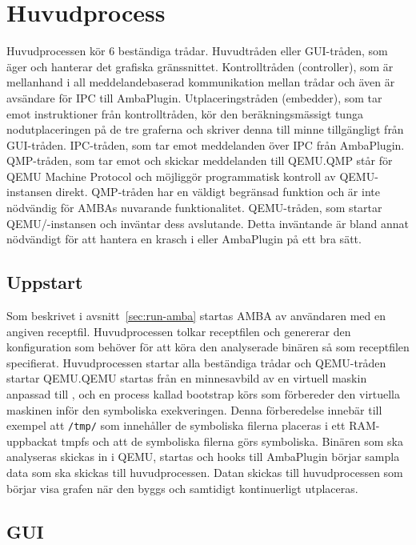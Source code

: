 \section{Huvudprocess}

Huvudprocessen kör 6 beständiga trådar.
Huvudtråden eller GUI-tråden, som äger och hanterar det grafiska gränssnittet.
Kontrolltråden (controller), som är mellanhand i all meddelandebaserad
kommunikation mellan trådar och även är avsändare för IPC till AmbaPlugin.
Utplaceringstråden (embedder), som tar emot instruktioner från kontrolltråden,
kör den beräkningsmässigt tunga nodutplaceringen på de tre graferna och skriver
denna till minne tillgängligt från GUI-tråden.
IPC-tråden, som tar emot meddelanden över IPC från AmbaPlugin.
QMP-tråden, som tar emot och skickar meddelanden till QEMU.\@ QMP står för QEMU
Machine Protocol och möjliggör programmatisk kontroll av QEMU-instansen direkt.
QMP-tråden har en väldigt begränsad funktion och är inte nödvändig för AMBAs
nuvarande funktionalitet.
QEMU-tråden, som startar QEMU/\stoe{}-instansen och inväntar dess avslutande.
Detta inväntande är bland annat nödvändigt för att hantera en krasch i \stoe{}
eller AmbaPlugin på ett bra sätt.

\subsection{Uppstart}

Som beskrivet i avsnitt~\ref{sec:run-amba} startas AMBA av användaren med en
angiven receptfil. Huvudprocessen tolkar receptfilen och genererar den
konfiguration som \stoe{} behöver för att köra den analyserade binären så som
receptfilen specifierat. Huvudprocessen startar alla beständiga trådar och
QEMU-tråden startar QEMU.\@ QEMU startas från en minnesavbild av en virtuell
maskin anpassad till \stoe{}, och en process kallad bootstrap körs som
förbereder den virtuella maskinen inför den symboliska exekveringen. Denna
förberedelse innebär till exempel att \verb|/tmp/| som innehåller de symboliska
filerna placeras i ett RAM-uppbackat tmpfs och att de symboliska filerna görs
symboliska. Binären som ska analyseras skickas in i QEMU, startas och hooks till
AmbaPlugin börjar sampla data som ska skickas till huvudprocessen. Datan skickas
till huvudprocessen som börjar visa grafen när den byggs och samtidigt
kontinuerligt utplaceras.

\subsection{GUI}

